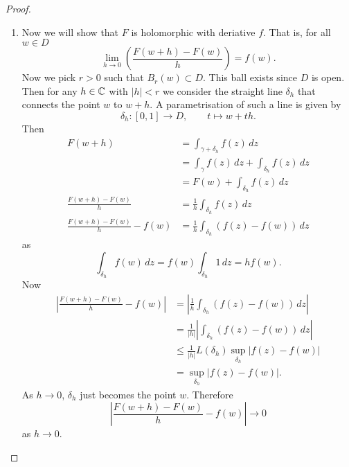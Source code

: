 \begin{proof}
\begin{enumerate}
        \item
            Now we will show that $F$ is holomorphic with deriative $f$.
            That is, for all $w \in D$
            \[
                \lim_{h \to 0} \left( \frac{F(w + h) - F(w)}{h} \right) = f(w).
            \]
            Now we pick $r > 0$ such that $B_r(w) \subset D$.
            This ball exists since $D$ is open.
            Then for any $h \in \mathbb{C}$ with $\lvert h \rvert < r$
            we consider the straight line $\delta_h$ that connects 
            the point $w$ to $w + h$.
            A parametrisation of such a line is given by
            \[
                \delta_h: [0, 1] \to D, \qquad t \mapsto w + th.
            \]
            Then
            \begin{align*}
                F(w + h)
                &= \int_{\gamma + \delta_h} f(z) \, dz \\
                &= \int_\gamma f(z) \, dz + \int_{\delta_h} f(z) \, dz \\
                &= F(w) + \int_{\delta_h} f(z) \, dz \\
                \frac{F(w + h) - F(w)}{h} 
                &= \frac1h \int_{\delta_h} f(z) \, dz \\
                \frac{F(w + h) - F(w)}{h} - f(w)
                &= \frac1h \int_{\delta_h} (f(z) - f(w)) \, dz
            \end{align*}
            as
            \[
                \int_{\delta_h} f(w) \, dz
                = f(w) \int_{\delta_h} 1 \, dz
                = hf(w).
            \]
            Now
            \begin{align*}
                \left\lvert \frac{F(w + h) - F(w)}{h} - f(w) \right\rvert
                &=    \left\lvert \frac1h \int_{\delta_h} (f(z) - f(w)) \, dz \right\rvert \\
                &=    \frac1{\lvert h \rvert}
                    \left\lvert
                        \int_{\delta_h} (f(z) - f(w)) \, dz
                    \right\rvert \\
                &\leq \frac1{\lvert h \rvert} L(\delta_h) 
                    \sup_{\delta_h}\lvert f(z) - f(w) \rvert
                \tag{est. lemma} \\
                &=    \sup_{\delta_h} \lvert f(z) - f(w) \rvert.
            \end{align*}
            As $h \to 0$, $\delta_h$ just becomes the point $w$.
            Therefore
            \[
                \left\lvert
                    \frac{F(w + h) - F(w)}{h} - f(w)
                \right\rvert
                \to 0
            \]
            as $h \to 0$.
    \end{enumerate}
\end{proof}
